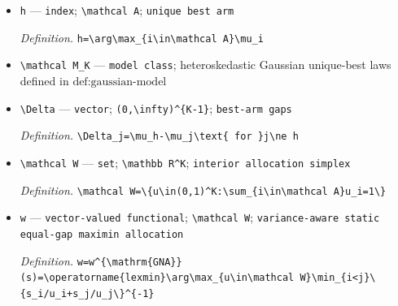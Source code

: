 \documentclass{article}
\begin{document}
\begin{itemize}
  \item \texttt{h} --- \texttt{index}; \texttt{\textbackslash{}\allowbreak{}mathcal A}; \texttt{unique best arm}
  \par\smallskip\noindent\emph{Definition.} \texttt{h=\allowbreak{}\textbackslash{}\allowbreak{}arg\textbackslash{}\allowbreak{}max\_\allowbreak{}\{i\textbackslash{}\allowbreak{}in\textbackslash{}\allowbreak{}mathcal A\}\allowbreak{}\textbackslash{}\allowbreak{}mu\_\allowbreak{}i}
  \item \texttt{\textbackslash{}\allowbreak{}mathcal M\_\allowbreak{}K} --- \texttt{model class}; heteroskedastic Gaussian unique-best laws defined in \(\text{def:gaussian-model}\)
  \item \texttt{\textbackslash{}\allowbreak{}Delta} --- \texttt{vector}; \texttt{(0,\allowbreak{}\textbackslash{}\allowbreak{}infty)\textasciicircum{}\{K-\allowbreak{}1\}\allowbreak{}}; \texttt{best-\allowbreak{}arm gaps}
  \par\smallskip\noindent\emph{Definition.} \texttt{\textbackslash{}\allowbreak{}Delta\_\allowbreak{}j=\allowbreak{}\textbackslash{}\allowbreak{}mu\_\allowbreak{}h-\allowbreak{}\textbackslash{}\allowbreak{}mu\_\allowbreak{}j\textbackslash{}\allowbreak{}text\{ for \}\allowbreak{}j\textbackslash{}\allowbreak{}ne h}
  \item \texttt{\textbackslash{}\allowbreak{}mathcal W} --- \texttt{set}; \texttt{\textbackslash{}\allowbreak{}mathbb R\textasciicircum{}K}; \texttt{interior allocation simplex}
  \par\smallskip\noindent\emph{Definition.} \texttt{\textbackslash{}\allowbreak{}mathcal W=\allowbreak{}\textbackslash{}\allowbreak{}\{u\textbackslash{}\allowbreak{}in(0,\allowbreak{}1)\textasciicircum{}K:\allowbreak{}\textbackslash{}\allowbreak{}sum\_\allowbreak{}\{i\textbackslash{}\allowbreak{}in\textbackslash{}\allowbreak{}mathcal A\}\allowbreak{}u\_\allowbreak{}i=\allowbreak{}1\textbackslash{}\allowbreak{}\}\allowbreak{}}
  \item \texttt{w} --- \texttt{vector-\allowbreak{}valued functional}; \texttt{\textbackslash{}\allowbreak{}mathcal W}; \texttt{variance-\allowbreak{}aware static equal-\allowbreak{}gap maximin allocation}
  \par\smallskip\noindent\emph{Definition.} \texttt{w=\allowbreak{}w\textasciicircum{}\{\textbackslash{}\allowbreak{}mathrm\{GNA\}\allowbreak{}\}\allowbreak{}(s)=\allowbreak{}\textbackslash{}\allowbreak{}operatorname\{lexmin\}\allowbreak{}\textbackslash{}\allowbreak{}arg\textbackslash{}\allowbreak{}max\_\allowbreak{}\{u\textbackslash{}\allowbreak{}in\textbackslash{}\allowbreak{}mathcal W\}\allowbreak{}\textbackslash{}\allowbreak{}min\_\allowbreak{}\{i<j\}\allowbreak{}\textbackslash{}\allowbreak{}\{s\_\allowbreak{}i/\allowbreak{}u\_\allowbreak{}i+\allowbreak{}s\_\allowbreak{}j/\allowbreak{}u\_\allowbreak{}j\textbackslash{}\allowbreak{}\}\allowbreak{}\textasciicircum{}\{-\allowbreak{}1\}\allowbreak{}}

\end{itemize}
\end{document}
